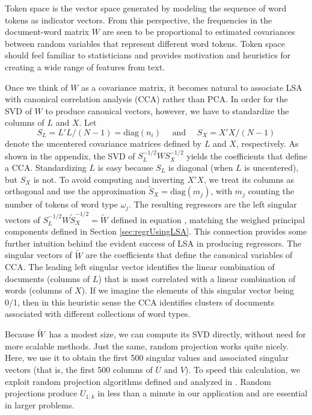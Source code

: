 \documentclass[12pt]{article}\usepackage[]{graphicx}\usepackage[]{color}
\newcommand{\Wt}{\mbox{$\widetilde{W}$}}
\begin{document}
 Token space is the vector space generated by modeling the sequence of word
 tokens as indicator vectors.  From this perspective, the frequencies in the
 document-word matrix $W$ are seen to be proportional to estimated covariances between random variables
 that represent different word tokens. Token space should feel
 familiar to statisticians and provides motivation and heuristics for
 creating a wide range of features from text.


 Once we think of $W$ as a covariance matrix, it becomes natural to
 associate LSA with canonical correlation analysis (CCA) rather than
 PCA.  In order for the SVD of $W$ to produce canonical vectors,
 however, we have to standardize the columns of $L$ and $X$.  Let
 \begin{equation}
   S_L = L'L/(N-1) = \mbox{diag}(n_i) \quad \mbox{ and  } \quad S_X = X'X/(N-1)
 \label{eq:SL}
 \end{equation}
 denote the uncentered covariance matrices defined by $L$ and $X$,
 respectively.  As shown in the appendix, the SVD of $S_L^{-1/2} W
 S_X^{-1/2}$ yields the coefficients that define a CCA.  Standardizing
 $L$ is easy because $S_L$ is diagonal (when $L$ is uncentered), but
 $S_X$ is not.  To avoid computing and inverting $X'X$, we treat its
 columns as orthogonal and use the approximation $\widetilde{S}_X =
 \mbox{diag}(m_j)$, with $m_j$ counting the number of tokens of word
 type $\omega_j$. The resulting regressors are the left singular
 vectors of $S_L^{-1/2} W \widetilde{S}_X^{-1/2} = \widetilde{W}$
 defined in equation , matching the weighed principal
 components defined in Section \ref{sec:regrUsingLSA}.  This
 connection provides some further intuition behind the evident success
 of LSA in producing regressors.  The singular vectors of
 $\widetilde{W}$ are the coefficients that define the canonical
 variables of CCA.  The leading left singular vector identifies the
 linear combination of documents (columns of $L$) that is most
 correlated with a linear combination of words (columns of $X$).  If
 we imagine the elements of this singular vector being 0/1, then in
 this heuristic sense the CCA identifies clusters of documents
 associated with different collections of word types.



 Because \Wt\ has a modest size, we can compute its SVD directly,
 without need for more scalable methods.  Just the same, random
 projection works quite nicely.  Here, we use it to obtain the first
 500 singular values and associated singular vectors (that is, the
 first 500 columns of $U$ and $V$).  To speed this calculation, we
 exploit random projection algorithms defined and analyzed in
 \citet{tropp10}.  Random projections produce $U_{1:k}$ in less than a
 minute in our application and are essential in larger problems.
\end{document}
